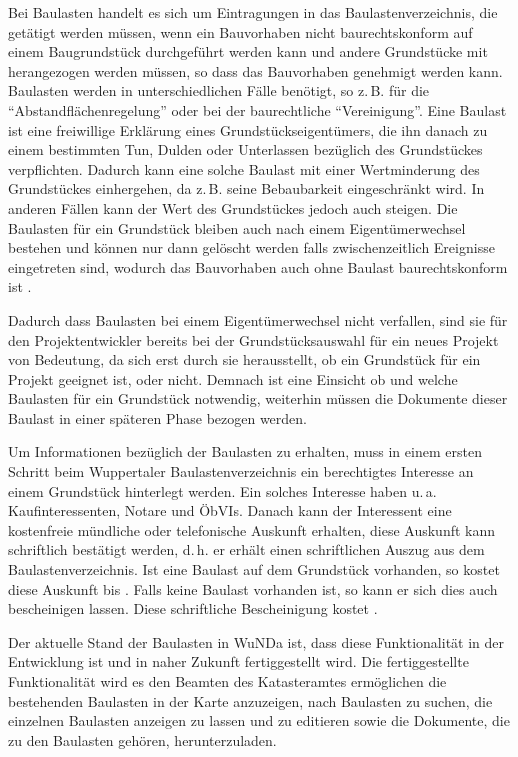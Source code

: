 Bei Baulasten handelt es sich um Eintragungen in das Baulastenverzeichnis, die getätigt werden müssen, wenn ein Bauvorhaben nicht baurechtskonform auf einem Baugrundstück durchgeführt werden kann und andere Grundstücke mit herangezogen werden müssen, so dass das Bauvorhaben genehmigt werden kann.
Baulasten werden in unterschiedlichen Fälle benötigt, so z.\,B. für die \enquote{Abstandflächenregelung} oder bei der baurechtliche \enquote{Vereinigung}.
Eine Baulast ist eine freiwillige Erklärung eines Grundstückseigentümers, die ihn danach zu einem bestimmten Tun, Dulden oder Unterlassen bezüglich des Grundstückes verpflichten.
Dadurch kann eine solche Baulast mit einer Wertminderung des Grundstückes einhergehen, da z.\,B. seine Bebaubarkeit eingeschränkt wird.
In anderen Fällen kann der Wert des Grundstückes jedoch auch steigen.
Die Baulasten für ein Grundstück bleiben auch nach einem Eigentümerwechsel bestehen und können nur dann gelöscht werden falls zwischenzeitlich Ereignisse eingetreten sind, wodurch das Bauvorhaben auch ohne Baulast baurechtskonform ist \autocite[vgl.][]{herne-baulasten}.

Dadurch dass Baulasten bei einem Eigentümerwechsel nicht verfallen, sind sie für den Projektentwickler bereits bei der Grundstücksauswahl für ein neues Projekt von Bedeutung, da sich erst durch sie herausstellt, ob ein Grundstück für ein Projekt geeignet ist, oder nicht. 
Demnach ist eine Einsicht ob und welche Baulasten für ein Grundstück notwendig, weiterhin müssen die Dokumente dieser Baulast in einer späteren Phase bezogen werden.

Um Informationen bezüglich der Baulasten zu erhalten, muss in einem ersten Schritt beim  Wuppertaler Baulastenverzeichnis \autocite[vgl.][]{wupp-baulast} ein berechtigtes Interesse an einem Grundstück hinterlegt werden.
Ein solches Interesse haben u.\,a. Kaufinteressenten, Notare und \acp{ÖbVI}.
Danach kann der Interessent eine kostenfreie mündliche oder telefonische Auskunft erhalten, diese Auskunft kann schriftlich bestätigt werden, d.\,h. er erhält einen schriftlichen Auszug  aus dem Baulastenverzeichnis.
Ist eine Baulast auf dem Grundstück vorhanden, so kostet diese Auskunft  bis .
Falls keine Baulast vorhanden ist, so kann er sich dies auch bescheinigen lassen. Diese schriftliche Bescheinigung kostet .

Der aktuelle Stand der Baulasten in \ac{WuNDa} ist, dass diese Funktionalität in der Entwicklung ist und in naher Zukunft fertiggestellt wird.
Die fertiggestellte Funktionalität wird es den Beamten des Katasteramtes ermöglichen die bestehenden Baulasten in der Karte anzuzeigen, nach Baulasten zu suchen, die einzelnen Baulasten anzeigen zu lassen und zu editieren sowie die Dokumente, die zu den Baulasten gehören, herunterzuladen.

